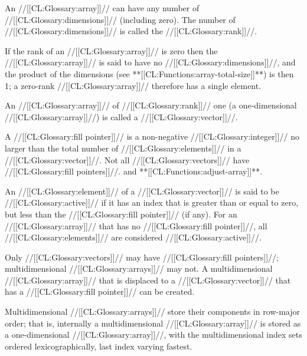 An //[[CL:Glossary:array]]// can have any number of //[[CL:Glossary:dimensions]]// (including zero).
The number of //[[CL:Glossary:dimensions]]// is called the //[[CL:Glossary:rank]]//.

If the rank of an //[[CL:Glossary:array]]// is zero then the //[[CL:Glossary:array]]// is said to have
no //[[CL:Glossary:dimensions]]//, and the product of the dimensions (see **[[CL:Functions:array-total-size]]**)
is then 1; a zero-rank //[[CL:Glossary:array]]// therefore has a single element.


An //[[CL:Glossary:array]]// of //[[CL:Glossary:rank]]// one (\ie a one-dimensional //[[CL:Glossary:array]]//)
is called a //[[CL:Glossary:vector]]//.


A //[[CL:Glossary:fill pointer]]// is a non-negative //[[CL:Glossary:integer]]// no
larger than the total number of //[[CL:Glossary:elements]]// in a //[[CL:Glossary:vector]]//.
Not all //[[CL:Glossary:vectors]]// have //[[CL:Glossary:fill pointers]]//.
 and **[[CL:Functions:adjust-array]]**.

An //[[CL:Glossary:element]]// of a //[[CL:Glossary:vector]]// is said to be //[[CL:Glossary:active]]// if it has
an index that is greater than or equal to zero, 
but less than the //[[CL:Glossary:fill pointer]]// (if any).
For an //[[CL:Glossary:array]]// that has no //[[CL:Glossary:fill pointer]]//,
all //[[CL:Glossary:elements]]// are considered //[[CL:Glossary:active]]//.


Only //[[CL:Glossary:vectors]]// may have //[[CL:Glossary:fill pointers]]//; 
multidimensional //[[CL:Glossary:arrays]]// may not.
A multidimensional //[[CL:Glossary:array]]// that is displaced to a //[[CL:Glossary:vector]]// 
that has a //[[CL:Glossary:fill pointer]]// can be created.

\endsubsubsubsubsection%

\endsubsubsubsection%




Multidimensional //[[CL:Glossary:arrays]]// store their components in row-major order;
that is, internally a multidimensional //[[CL:Glossary:array]]// is stored as a
one-dimensional //[[CL:Glossary:array]]//, with the multidimensional index sets
ordered lexicographically, last index varying fastest.  
 
